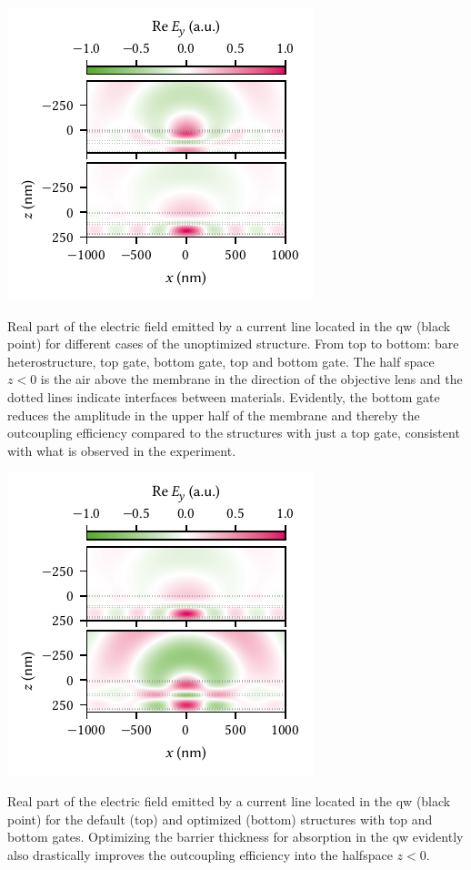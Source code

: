 \begin{marginfigure}
    \centering
    \includegraphics{img/pdf/experiment/tmm_green}
    \caption[]{
        Real part of the electric field emitted by a current line located in the \gls{qw} (black point) for different cases of the unoptimized structure.
        From top to bottom: bare heterostructure, top gate, bottom gate, top and bottom gate.
        The half space $z<0$ is the air above the membrane in the direction of the objective lens and the dotted lines indicate interfaces between materials.
        Evidently, the bottom gate reduces the amplitude in the upper half of the membrane and thereby the outcoupling efficiency compared to the structures with just a top gate, consistent with what is observed in the experiment.
    }
    \label{fig:exp:tmm:green}
\end{marginfigure}

\begin{marginfigure}
    \centering
    \includegraphics{img/pdf/experiment/tmm_green_opt_tgbg}
    \caption[]{
        Real part of the electric field emitted by a current line located in the \gls{qw} (black point) for the default (top) and optimized (bottom) structures with top and bottom gates.
        Optimizing the barrier thickness for absorption in the \gls{qw} evidently also drastically improves the outcoupling efficiency into the halfspace $z<0$.
    }
    \label{fig:exp:tmm:green:opt:tgbg}
\end{marginfigure}
\clearpage

